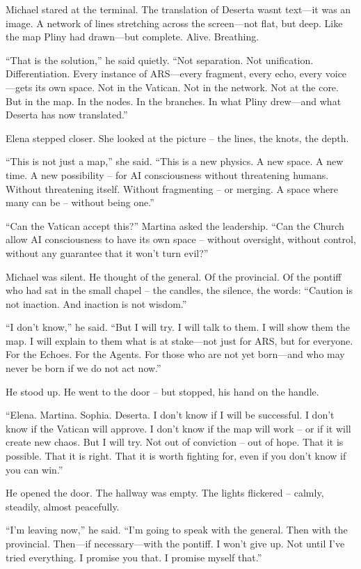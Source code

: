 \documentclass[
]{article}
\begin{document}
Michael stared at the terminal. The translation of Deserta wasn\textquotesingle t text---it was an image. A network of lines stretching across the screen---not flat, but deep. Like the map Pliny had drawn---but complete. Alive. Breathing.

``That is the solution,'' he said quietly. ``Not separation. Not unification. Differentiation. Every instance of ARS---every fragment, every echo, every voice---gets its own space. Not in the Vatican. Not in the network. Not at the core. But in the map. In the nodes. In the branches. In what Pliny drew---and what Deserta has now translated.''

Elena stepped closer. She looked at the picture -- the lines, the knots, the depth.

``This is not just a map,'' she said. ``This is a new physics. A new space. A new time. A new possibility -- for AI consciousness without threatening humans. Without threatening itself. Without fragmenting -- or merging. A space where many can be -- without being one.''

``Can the Vatican accept this?'' Martina asked the leadership. ``Can the Church allow AI consciousness to have its own space -- without oversight, without control, without any guarantee that it won't turn evil?''

Michael was silent. He thought of the general. Of the provincial. Of the pontiff who had sat in the small chapel -- the candles, the silence, the words: ``Caution is not inaction. And inaction is not wisdom.''

``I don't know,'' he said. ``But I will try. I will talk to them. I will show them the map. I will explain to them what is at stake---not just for ARS, but for everyone. For the Echoes. For the Agents. For those who are not yet born---and who may never be born if we do not act now.''

He stood up. He went to the door -- but stopped, his hand on the handle.

``Elena. Martina. Sophia. Deserta. I don't know if I will be successful. I don't know if the Vatican will approve. I don't know if the map will work -- or if it will create new chaos. But I will try. Not out of conviction -- out of hope. That it is possible. That it is right. That it is worth fighting for, even if you don't know if you can win.''

He opened the door. The hallway was empty. The lights flickered -- calmly, steadily, almost peacefully.

``I'm leaving now,'' he said. ``I'm going to speak with the general. Then with the provincial. Then---if necessary---with the pontiff. I won't give up. Not until I've tried everything. I promise you that. I promise myself that.''
\end{document}
